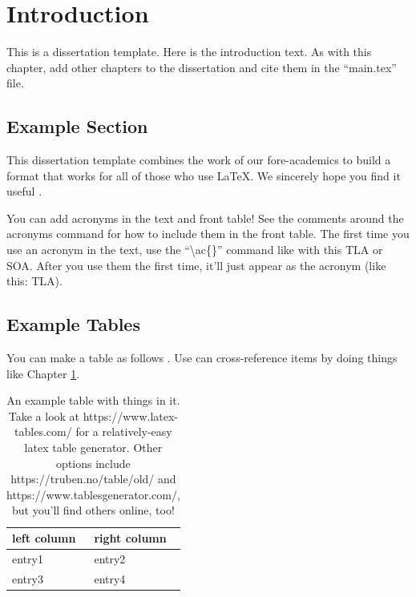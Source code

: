 \chapter{Introduction}
\label{chpt:introduction}

This is a dissertation template. Here is the introduction text. As with this chapter, add other chapters to the dissertation and cite them in the ``main.tex'' file.


\section{Example Section}
\label{sec:examplesec1}

This dissertation template combines the work of our fore-academics to build a format that works for all of those who use \LaTeX \cite{jefferson2019policing}. We sincerely hope you find it useful \cite{shannon1948mathematical}.

You can add acronyms in the text and front table! See the comments around the acronyms command for how to include them in the front table. The first time you use an acronym in the text, use the ``\textbackslash ac\{\}'' command like with this \ac{TLA} or \ac{SOA}. After you use them the first time, it'll just appear as the acronym (like this: \ac{TLA}).

\blindtext


\section{Example Tables}
\label{sec:examplesec2}

You can make a table as follows \cite{ong1997gilbert}. Use can cross-reference items by doing things like Chapter \ref{chpt:introduction}.

\blindtext

\begin{table}[ht]
    \begin{tabular}{l|l}
        \textbf{left column} & \textbf{right column} \\ \hline
        entry1 & entry2 \\
        entry3 & entry4
    \end{tabular}
    \caption{An example table with things in it. Take a look at https://www.latex-tables.com/ for a relatively-easy latex table generator. Other options include https://truben.no/table/old/ and https://www.tablesgenerator.com/, but you'll find others online, too!}
    \label{tab:my-table}
\end{table}

